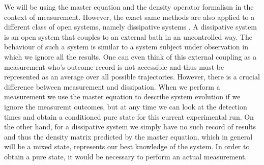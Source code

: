 We will be using the master equation and the density operator
formalism in the context of measurement. However, the exact same
methods are also applied to a different class of open systems, namely
dissipative systems \cite{QuantumNoise}. A dissipative system is an
open system that couples to an external bath in an uncontrolled
way. The behaviour of such a system is similar to a system subject
under observation in which we ignore all the results. One can even
think of this external coupling as a measurement who's outcome record
is not accessible and thus must be represented as an average over all
possible trajectories. However, there is a crucial difference between
measurement and dissipation. When we perform a measurement we use the
master equation to describe system evolution if we ignore the
measuremt outcomes, but at any time we can look at the detection times
and obtain a conditioned pure state for this current experimental
run. On the other hand, for a dissipative system we simply have no
such record of results and thus the density matrix predicted by the
master equation, which in general will be a mixed state, represents
our best knowledge of the system. In order to obtain a pure state, it
would be necessary to perform an actual measurement.

